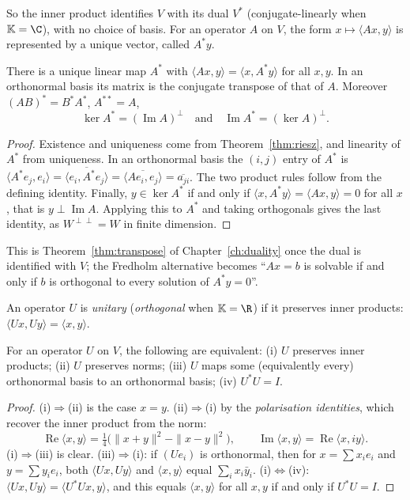 So the inner product identifies $V$ with its dual $V^*$ (conjugate-linearly when $\mathbb K=\C$), with no choice of basis.
For an operator $A$ on $V$, the form $x\mapsto\langle Ax,y\rangle$ is represented by a unique vector, called $A^*y$.

\begin{proposition}\label{prop:adjoint}
There is a unique linear map $A^*$ with $\langle Ax,y\rangle=\langle x,A^*y\rangle$ for all $x,y$. In an orthonormal
basis its matrix is the conjugate transpose of that of $A$. Moreover $(AB)^*=B^*A^*$, $A^{**}=A$,
\[
\ker A^*=(\operatorname{Im}A)^\perp\quad\text{and}\quad\operatorname{Im}A^*=(\ker A)^\perp.
\]
\end{proposition}
\begin{proof}
Existence and uniqueness come from Theorem~\ref{thm:riesz}, and linearity of $A^*$ from uniqueness. In an orthonormal
basis the $(i,j)$ entry of $A^*$ is $\langle A^*e_j,e_i\rangle=\overline{\langle e_i,A^*e_j\rangle}=\overline{\langle
Ae_i,e_j\rangle}=\overline{a_{ji}}$. The two product rules follow from the defining identity. Finally, $y\in\ker A^*$ if
and only if $\langle x,A^*y\rangle=\langle Ax,y\rangle=0$ for all $x$, that is $y\perp\operatorname{Im}A$. Applying this to
$A^*$ and taking orthogonals gives the last identity, as $W^{\perp\perp}=W$ in finite dimension.
\end{proof}

This is Theorem~\ref{thm:transpose} of Chapter~\ref{ch:duality} once the dual is identified with $V$; the Fredholm
alternative becomes ``$Ax=b$ is solvable if and only if $b$ is orthogonal to every solution of $A^*y=0$''.

An operator $U$ is \emph{unitary} (\emph{orthogonal} when $\mathbb K=\R$) if it preserves inner products:
$\langle Ux,Uy\rangle=\langle x,y\rangle$.

\begin{theorem}\label{thm:unitary}
For an operator $U$ on $V$, the following are equivalent: (i) $U$ preserves inner products; (ii) $U$ preserves norms;
(iii) $U$ maps some (equivalently every) orthonormal basis to an orthonormal basis; (iv) $U^*U=I$.
\end{theorem}
\begin{proof}
(i)$\Rightarrow$(ii) is the case $x=y$. (ii)$\Rightarrow$(i) by the \emph{polarisation identities}, which recover the inner
product from the norm:
\[
\operatorname{Re}\langle x,y\rangle=\tfrac14\bigl(\|x+y\|^2-\|x-y\|^2\bigr),\qquad \operatorname{Im}\langle x,y\rangle=
\operatorname{Re}\langle x,iy\rangle.
\]
(i)$\Rightarrow$(iii) is clear. (iii)$\Rightarrow$(i): if $(Ue_i)$ is orthonormal, then for $x=\sum x_ie_i$ and $y=\sum
y_ie_i$, both $\langle Ux,Uy\rangle$ and $\langle x,y\rangle$ equal $\sum_ix_i\bar y_i$. (i)$\Leftrightarrow$(iv):
$\langle Ux,Uy\rangle=\langle U^*Ux,y\rangle$, and this equals $\langle x,y\rangle$ for all $x,y$ if and only if $U^*U=I$.
\end{proof}

